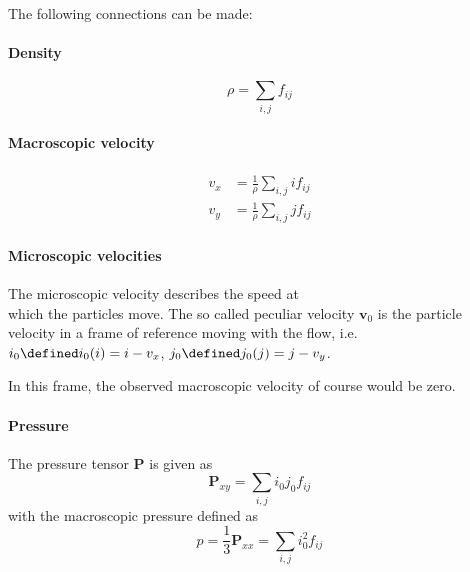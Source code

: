 
The following connections can be made:
\paragraph{Density}
\label{par:Density}
\begin{equation}
  \rho = \sum_{i,j} f_{ij}
\end{equation}

\paragraph{Macroscopic velocity}
\label{par:Macroscopic velocity}
\begin{equation}
  \begin{aligned}
    v_x & = \frac{1}{\rho}\sum_{i,j} i f_{ij} \\
    v_y & = \frac{1}{\rho}\sum_{i,j} j f_{ij}
  \end{aligned}
\end{equation}

\paragraph{Microscopic velocities}
\label{par:Microscopic velocities}

The microscopic velocity describes the speed at \\which the particles move. The so called  peculiar velocity $\mathbf{v}_0$ is the particle velocity in a frame of reference moving with the flow, i.e. $i_0 \defined i_0(i) = i-v_x$, $j_0 \defined j_0(j) = j-v_y$.

In this frame, the observed macroscopic velocity of course would be zero.

\paragraph{Pressure}
\label{par:Pressure}
The pressure tensor $\mathbf{P}$ is given as
\begin{equation}
  \mathbf{P}_{xy} = \sum_{i,j} i_0 j_0 f_{ij}
\end{equation}
with the macroscopic pressure defined as
\begin{equation}
  p = \frac{1}{3}\mathbf{P}_{xx} = \sum_{i,j} i_0^2 f_{ij}
\end{equation}

